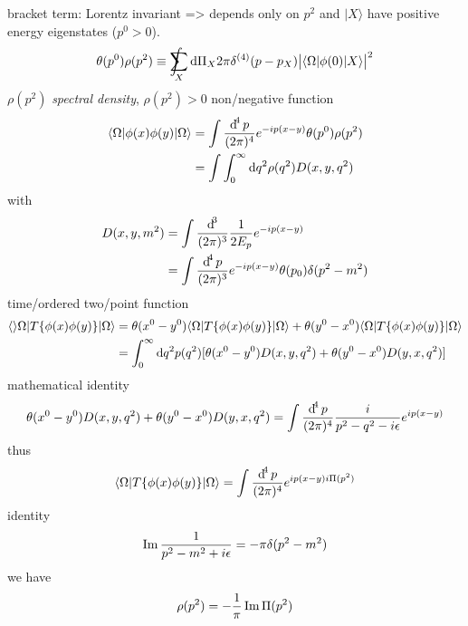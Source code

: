 \documentclass[../../index.tex]{subfiles}
\begin{document}
bracket term: Lorentz invariant => depends only on $p^2$ and $\vert X \rangle$
have positive energy eigenstates ($p^0 > 0$).
\begin{equation}
  \theta(p^0) \rho(p^2) \equiv \intsum_X \dif \Pi_X  2\pi \delta^{(4)}(p-p_X) \abs{\langle \Omega \vert \phi(0) \vert X \rangle}^2
\end{equation}
$\rho(p^2)$ \textit{spectral density}, $\rho(p^2) > 0$ non\-/negative function
\begin{equation}
  \begin{split}
    \langle \Omega \vert \phi(x) \phi(y) \vert \Omega \rangle &= \int \fdif{p} e^{-i p(x-y)} \theta(p^0) \rho(p^2) \\
    &= \int \int_0^\infty \dif q^2 \rho(q^2) D(x, y, q^2)
  \end{split}
\end{equation}
with
\begin{equation}
  \begin{split}
    D(x,y,m^2) &= \int \frac{\dif^3}{(2\pi)^3} \frac{1}{2E_p} e^{-i p (x-y)} \\
    &= \int \frac{\dif^4 p}{(2\pi)^3} e^{-i p (x-y)} \theta(p_0) \delta(p^2 - m^2)
  \end{split}
\end{equation}
time\-/ordered two\-/point function
\begin{equation}
  \begin{split}
    \langle\rangle \Omega\vert T\{ \phi(x)\phi(y) \} \vert\Omega\rangle
    &= \theta(x^0-y^0) \langle\Omega\vert T\{ \phi(x)\phi(y) \} \vert\Omega\rangle + \theta(y^0-x^0)\langle\Omega\vert T\{ \phi(x)\phi(y) \} \vert\Omega\rangle  \\
    &= \int_0^\infty \dif q^2 p(q^2) [ \theta(x^0 - y^0)D(x,y,q^2) + \theta(y^0-x^0)D(y,x,q^2) ]
  \end{split} 
\end{equation}
mathematical identity
\begin{equation}
  \theta(x^0-y^0)D(x,y,q^2) + \theta(y^0-x^0)D(y,x,q^2) = \int \fdif{p} \frac{i}{p^2-q^2-i\epsilon}e^{ip(x-y)}
\end{equation}
thus
\begin{equation}
  \langle\Omega\vert T\{ \phi(x)\phi(y) \} \vert\Omega\rangle = \int \fdif{p} e^{ip(x-y) i\Pi(p^2)}
\end{equation}
identity
\begin{equation}
  \label{eq:cuttingRules}
  \operatorname{Im} \frac{1}{p^2-m^2+i\epsilon} = -\pi \delta(p^2-m^2)
\end{equation}
we have
\begin{equation}
  \rho(p^2) = -\frac{1}{\pi} \operatorname{Im}\Pi(p^2)
\end{equation}
\end{document}
